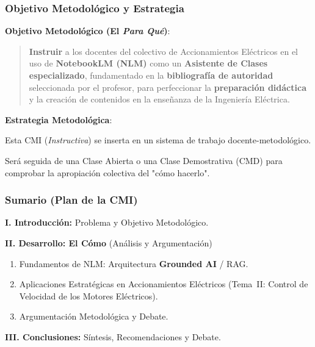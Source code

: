 \documentclass[aspectratio=43]{beamer}
\begin{document}
\begin{frame}
\frametitle{Objetivo Metodológico y Estrategia}

\textbf{Objetivo Metodológico (El \textit{Para Qué})}:
\begin{quote}
\textbf{Instruir} a los docentes del colectivo de Accionamientos Eléctricos en el uso de \textbf{NotebookLM (NLM)} como un \textbf{Asistente de Clases especializado}, fundamentado en la \textbf{bibliografía de autoridad} seleccionada por el profesor, para perfeccionar la \textbf{preparación didáctica} y la creación de contenidos en la enseñanza de la Ingeniería Eléctrica.
\end{quote}
\textbf{Estrategia Metodológica}:
\begin{itemize}
  {\small
    \item Esta CMI (\textit{Instructiva}) se inserta en un sistema de trabajo docente-metodológico.
    \item Será seguida de una Clase Abierta o una Clase Demostrativa (CMD) para comprobar la apropiación colectiva del "cómo hacerlo".
  }
  \end{itemize}
\end{frame}

\begin{frame}
\frametitle{Sumario (Plan de la CMI)}

\textbf{I. Introducción:} Problema y Objetivo Metodológico.

\textbf{II. Desarrollo: El Cómo} (Análisis y Argumentación)
\begin{enumerate}
    \item Fundamentos de NLM: Arquitectura \textbf{Grounded AI} / RAG.
    \item Aplicaciones Estratégicas en Accionamientos Eléctricos (Tema~II: Control de Velocidad de los Motores Eléctricos).
    \item Argumentación Metodológica y Debate.
\end{enumerate}

\textbf{III. Conclusiones:} Síntesis, Recomendaciones y Debate.
\end{frame}
\end{document}
